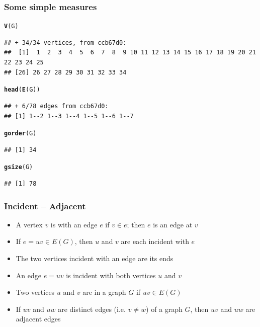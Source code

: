 \documentclass[aspectratio=169]{beamer}\usepackage[]{graphicx}\usepackage[]{xcolor}
\makeatletter
\newcommand{\hldef}[1]{\textcolor[rgb]{0.345,0.345,0.345}{#1}}%
\newcommand{\hlkwd}[1]{\textcolor[rgb]{0.737,0.353,0.396}{\textbf{#1}}}%
\newenvironment{kframe}{%
 \def\at@end@of@kframe{}%
 \ifinner\ifhmode%
  \def\at@end@of@kframe{\end{minipage}}%
  \begin{minipage}{\columnwidth}%
 \fi\fi%
 \def\FrameCommand##1{\hskip\@totalleftmargin \hskip-\fboxsep
 \colorbox{shadecolor}{##1}\hskip-\fboxsep
     \hskip-\linewidth \hskip-\@totalleftmargin \hskip\columnwidth}%
 \MakeFramed {\advance\hsize-\width
   \@totalleftmargin\z@ \linewidth\hsize
   \@setminipage}}%
 {\par\unskip\endMakeFramed%
 \at@end@of@kframe}
\newenvironment{knitrout}{}{} %
\makeatother
\begin{document}
\begin{frame}[fragile]\frametitle{Some simple measures}
\begin{knitrout}
\color{fgcolor}\begin{kframe}
\begin{alltt}
\hlkwd{V}\hldef{(G)}
\end{alltt}
\begin{verbatim}
## + 34/34 vertices, from ccb67d0:
##  [1]  1  2  3  4  5  6  7  8  9 10 11 12 13 14 15 16 17 18 19 20 21 22 23 24 25
## [26] 26 27 28 29 30 31 32 33 34
\end{verbatim}
\begin{alltt}
\hlkwd{head}\hldef{(}\hlkwd{E}\hldef{(G))}
\end{alltt}
\begin{verbatim}
## + 6/78 edges from ccb67d0:
## [1] 1--2 1--3 1--4 1--5 1--6 1--7
\end{verbatim}
\begin{alltt}
\hlkwd{gorder}\hldef{(G)}
\end{alltt}
\begin{verbatim}
## [1] 34
\end{verbatim}
\begin{alltt}
\hlkwd{gsize}\hldef{(G)}
\end{alltt}
\begin{verbatim}
## [1] 78
\end{verbatim}
\end{kframe}
\end{knitrout}
\end{frame}

\begin{frame}\frametitle{Incident -- Adjacent}
	\begin{definition}[Incident]
	\begin{itemize}
	\item A vertex $v$ is  with an edge $e$ if $v\in e$; then $e$ is an edge at $v$
	\item If $e=uv\in E(G)$, then $u$ and $v$ are each incident with $e$
	\item The two vertices incident with an edge are its ends
	\item An edge $e=uv$ is incident with both vertices $u$ and $v$
	\end{itemize}
	\end{definition}
	\vfill
	\begin{definition}[Adjacent]
	\begin{itemize}
	\item Two vertices $u$ and $v$ are  in a graph $G$ if $uv\in E(G)$
	\item If $uv$ and $uw$ are distinct edges (i.e. $v\not=w$) of a graph $G$, then $uv$ and $uw$ are adjacent edges
	\end{itemize}
	\end{definition}
\end{frame}
\end{document}
